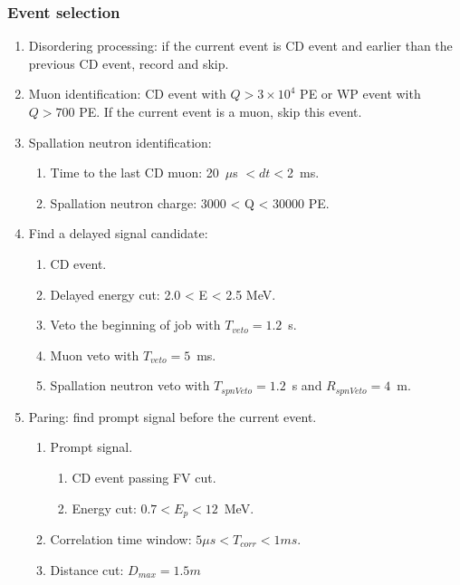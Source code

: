     \subsubsection{Event selection} 
    \begin{enumerate}
        \item Disordering processing: if the current event is CD event and earlier than the previous CD event, record and skip.
        \item Muon identification: CD event with $Q>3 \times 10^4$ PE or WP event with $Q>700$ PE. 
        If the current event is a muon, skip this event.
        \item Spallation neutron identification:
        \begin{enumerate}
            \item Time to the last CD muon: 20~$\mu$s $< dt < $2~ms.
            \item Spallation neutron charge: 3000 < Q < 30000 PE.
        \end{enumerate}
        \item Find a delayed signal candidate:
        \begin{enumerate}
            \item CD event.
            \item Delayed energy cut: 2.0 < E < 2.5 MeV.
            \item Veto the beginning of job with $T_{veto} = 1.2$~s.
            \item Muon veto with $T_{veto} = 5$~ms.
            \item Spallation neutron veto with  $T_{spnVeto} = 1.2$~s and $R_{spnVeto} = 4$~m.
        \end{enumerate}
        \item Paring: find prompt signal before the current event.
        \begin{enumerate}
            \item Prompt signal.
            \begin{enumerate}
                \item CD event passing FV cut.
                \item Energy cut: $0.7 < E_p < 12 $~MeV.
            \end{enumerate}
            \item Correlation time window: $5\mu s<T_{corr} < 1 ms$.
            \item Distance cut: $D_{max} = 1.5 m$

\end{enumerate}
\end{enumerate}
